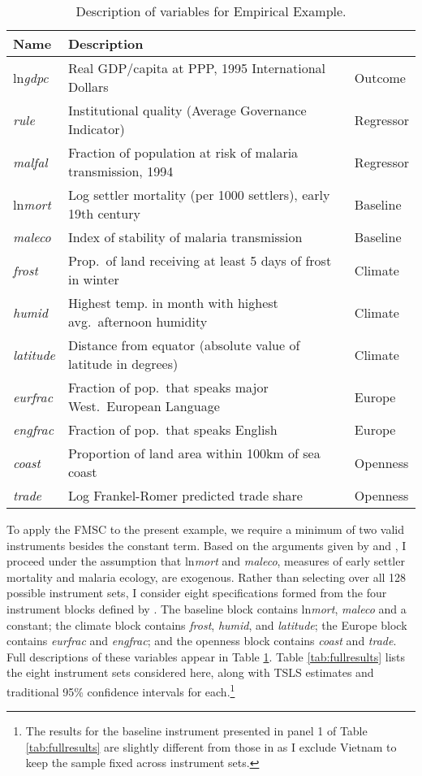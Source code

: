 \begin{table}[!tbp]
\small
\centering
\begin{tabular}{lll}
\hline \hline
Name& Description &\\
\hline
ln\emph{gdpc}&Real GDP/capita at PPP, 1995 International Dollars &Outcome\\
\emph{rule}&Institutional quality (Average Governance Indicator)&Regressor\\
\emph{malfal}&Fraction of population at risk of malaria transmission, 1994&Regressor\\
ln\emph{mort}&Log settler mortality (per 1000 settlers), early 19th century&Baseline\\
\emph{maleco}&Index of stability of malaria transmission&Baseline\\
\emph{frost}&Prop.\ of land receiving at least 5 days of frost in winter&Climate\\
\emph{humid}&Highest temp. in month with highest avg.\ afternoon humidity&Climate\\
\emph{latitude}&Distance from equator (absolute value of latitude in degrees)&Climate \\
\emph{eurfrac}&Fraction of pop.\ that speaks major West.\ European Language&Europe \\
\emph{engfrac}&Fraction of pop.\ that speaks English&Europe\\
\emph{coast}&Proportion of land area within 100km of sea coast&Openness\\
\emph{trade}&Log Frankel-Romer predicted trade share&Openness\\
\hline
\end{tabular}
\caption{Description of variables for Empirical Example.}
\label{tab:desc}
\end{table}

To apply the FMSC to the present example, we require a minimum of two valid instruments besides the constant term. 
Based on the arguments given by \cite{Acemoglu} and \cite{Sachs}, I proceed under the assumption that ln\emph{mort} and \emph{maleco}, measures of early settler mortality and malaria ecology, are exogenous.
Rather than selecting over all 128 possible instrument sets, I consider eight specifications formed from the four instrument blocks defined by \cite{Carstensen2006}.
The baseline block contains ln\emph{mort}, \emph{maleco} and a constant; the climate block contains \emph{frost}, \emph{humid}, and \emph{latitude}; the Europe block contains \emph{eurfrac} and \emph{engfrac}; and the openness block contains \emph{coast} and \emph{trade}. 
Full descriptions of these variables appear in Table \ref{tab:desc}.
Table \ref{tab:fullresults} lists the eight instrument sets considered here, along with TSLS estimates and traditional 95\% confidence intervals for each.\footnote{The results for the baseline instrument presented in panel 1 of Table \ref{tab:fullresults} are slightly different from those in \cite{Carstensen2006} as I exclude Vietnam to keep the sample fixed across instrument sets.} 



